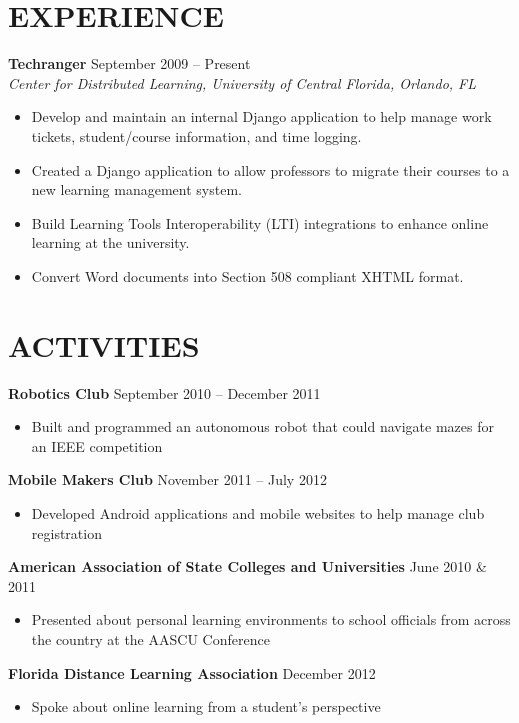 \documentclass[margin]{res}
\begin{document}
\begin{resume}
\section{EXPERIENCE} 
\textbf{Techranger} \hfill September 2009 -- Present \\
\textit{Center for Distributed Learning, University of Central Florida, Orlando, FL} \smallskip
\begin{itemize}[leftmargin=10pt]
\item Develop and maintain an internal Django application to help manage work tickets, student/course information, and time logging.
\item Created a Django application to allow professors to migrate their courses to a new learning management system.
\item Build Learning Tools Interoperability (LTI) integrations to enhance online learning at the university.
\item Convert Word documents into Section 508 compliant XHTML format.
\end{itemize}

\section{ACTIVITIES}             
\textbf{Robotics Club} \hfill September 2010 -- December 2011
\begin{itemize}[leftmargin=10pt]
\itemsep -2pt %
\item Built and programmed an autonomous robot that could navigate mazes for an IEEE competition
\end{itemize}

\textbf{Mobile Makers Club} \hfill November 2011 -- July 2012 
\begin{itemize}[leftmargin=10pt]
\itemsep -2pt %
\item Developed Android applications and mobile websites to help manage club registration
\end{itemize}

\textbf{American Association of State Colleges and Universities} \hfill June 2010 \& 2011
\begin{itemize}[leftmargin=10pt]
\itemsep -2pt %
\item Presented about personal learning environments to school officials from across the country at the AASCU Conference
\end{itemize}

\textbf{Florida Distance Learning Association} \hfill December 2012
\begin{itemize}[leftmargin=10pt]
\itemsep -2pt %
\item Spoke about online learning from a student's perspective
\end{itemize}


\end{resume}
\end{document}
